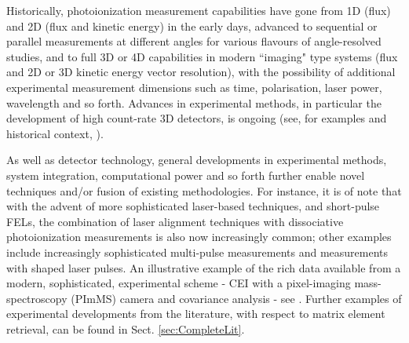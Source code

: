 \documentclass[10pt]{article}
\begin{document}
Historically, photoionization measurement capabilities have gone from 1D (flux) and 2D (flux and kinetic energy) in the early days, advanced to sequential or parallel measurements at different angles for various flavours of angle-resolved studies, and to full 3D or 4D capabilities in modern ``imaging" type systems (flux and 2D or 3D kinetic energy vector resolution), with the possibility of additional experimental measurement dimensions such as time, polarisation, laser power, wavelength and so forth. Advances in experimental methods, in particular the development of high count-rate 3D detectors, is ongoing (see, for examples and historical context, \cite{Parker1997,Dorner1997a,Continetti2001,Vallance2013,chandler2017PerspectiveAdvancedParticle}). 

As well as detector technology, general developments in experimental methods, system integration, computational power and so forth further enable novel techniques and/or fusion of existing methodologies. For instance, it is of note that with the advent of more sophisticated laser-based techniques, and short-pulse FELs, the combination of laser alignment techniques with dissociative photoionization measurements is also now increasingly common; other examples include increasingly sophisticated multi-pulse measurements and measurements with shaped laser pulses. An illustrative example of the rich data available from a modern, sophisticated, experimental scheme - CEI with a pixel-imaging mass-spectroscopy (PImMS) camera and covariance analysis - see \cite{Slater2015}. Further examples of experimental developments from the literature, with respect to matrix element retrieval, can be found in Sect. \ref{sec:CompleteLit}.





\end{document}
